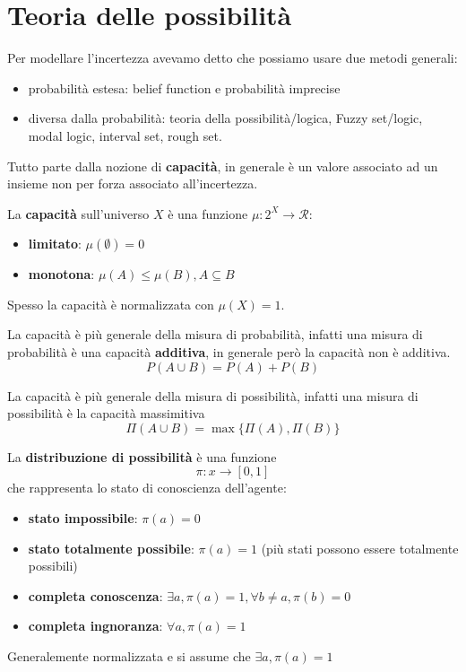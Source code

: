 \section{Teoria delle possibilità}
Per modellare l'incertezza avevamo detto che possiamo usare due metodi generali:
\begin{itemize}
    \item probabilità estesa: belief function e probabilità imprecise
    \item diversa dalla probabilità: teoria della possibilità/logica, Fuzzy set/logic,
    modal logic, interval set, rough set.
\end{itemize}
Tutto parte dalla nozione di \textbf{capacità}, in generale è un valore associato 
ad un insieme non per forza associato all'incertezza.

\begin{definizione}
    La \textbf{capacità} sull'universo $X$ è una funzione $\mu:2^X\to \mathcal{R}$:
    \begin{itemize}
        \item \textbf{limitato}: $\mu(\emptyset) = 0$
        \item \textbf{monotona}: $\mu(A) \le \mu(B), A\subseteq B$
    \end{itemize}
    Spesso la capacità è normalizzata con $\mu(X)=1$.
\end{definizione}

La capacità è più generale della misura di probabilità, infatti una misura di probabilità è una capacità
\textbf{additiva}, in generale però la capacità non è additiva.
$$P(A\cup B) = P(A)+ P(B)$$

La capacità è più generale della misura di possibilità, infatti una misura di possibilità 
è la capacità massimitiva
$$\Pi(A\cup B) = \max\{\Pi(A),\Pi(B)\}$$

\begin{definizione} 
    La \textbf{distribuzione di possibilità} è una funzione 
    $$\pi:x\to [0,1]$$
    che rappresenta lo stato di conoscienza dell'agente:
    \begin{itemize}
        \item \textbf{stato impossibile}: $\pi(a)=0$
        \item \textbf{stato totalmente possibile}: $\pi(a)=1$ (più stati possono 
        essere totalmente possibili)
        \item \textbf{completa conoscenza}: $\exists a,\pi(a) = 1,\forall b\ne a,\pi(b)=0$
        \item \textbf{completa ingnoranza}: $\forall a,\pi(a) = 1$
    \end{itemize} 
    Generalemente normalizzata e si assume che $\exists a,\pi(a) = 1$
\end{definizione}


